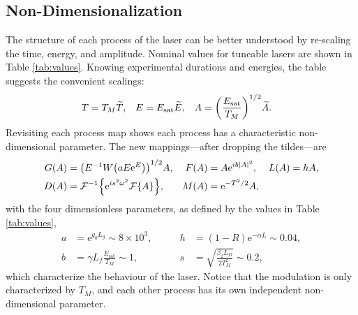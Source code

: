 \documentclass[graybox]{svmult}
\let\originalleft\left
\let\originalright\right
\renewcommand{\left}{\mathopen{}\mathclose\bgroup\originalleft}
\renewcommand{\right}{\aftergroup\egroup\originalright}
\newcommand{\Es}{E_{\textrm{sat}}}
\newcommand{\FT}[1]{\mathcal{F}\left\{ #1 \right\}}
\newcommand{\FTi}[1]{\mathcal{F}^{-1}\left\{ #1 \right\}}
\begin{document}
\subsection{Non-Dimensionalization}
The structure of each process of the laser can be better understood by re-scaling the time, energy, and amplitude. Nominal values for tuneable lasers are shown in Table \ref{tab:values}. Knowing experimental durations and energies, the table suggests the convenient scalings:
\begin{align}
	T &= T_M \widetilde{T},& E &= \Es \widetilde{E},& A &= \left( \frac{\Es}{T_M} \right)^{1/2} \widetilde{A}.
\end{align}
Revisiting each process map shows each process has a characteristic non-dimensional parameter. The new mappings---after dropping the tildes---are
\begin{equation}
	\begin{aligned}
		G(A) &= \left(E^{-1} W \left( a E \textrm{e}^{E}\right) \right)^{1/2} A, & F(A) &= A \textrm{e}^{i b |A|^2}, & L(A) &= h A, \\
		D(A) &= \FTi{\textrm{e}^{i s^2 \omega^2} \FT{A}}, & M(A) &= \textrm{e}^{-T^2 / 2} A,
		\label{eq:effects}
	\end{aligned}
\end{equation}
with the four dimensionless parameters, as defined by the values in Table \ref{tab:values},
\begin{equation}
	\begin{aligned}
		a &= \textrm{e}^{g_0 L_g} \sim 8 \times 10^3,& \qquad h &= (1 - R) \textrm{e}^{-\alpha L} \sim 0.04, \\
		b &= \gamma L_f \frac{\Es}{T_M} \sim 1,& \qquad s &= \sqrt{\frac{\beta_2 L_D}{2 T_M^2}} \sim 0.2,
		\label{eq:ndparam}
	\end{aligned}
\end{equation}
which characterize the behaviour of the laser. Notice that the modulation is only characterized by $T_M$, and each other process has its own independent non-dimensional parameter.
\end{document}
